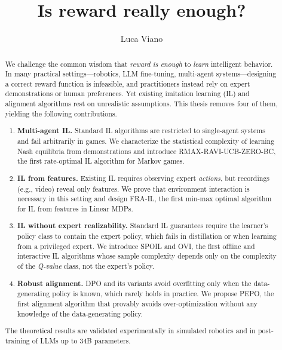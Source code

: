 \documentclass{article}
\title{\textbf{Is reward really enough?}}
\author[1]{Luca Viano}
\affil[1]{EPFL}
\begin{document}
\maketitle
\begin{abstract}
We challenge the common wisdom that \emph{reward is enough} to \emph{learn} intelligent behavior. In many practical settings---robotics, LLM fine-tuning, multi-agent systems---designing a correct reward function is infeasible, and practitioners instead rely on expert demonstrations or human preferences. Yet existing imitation learning (IL) and alignment algorithms rest on unrealistic assumptions. This thesis removes four of them, yielding the following contributions.
\begin{enumerate}
    \item \textbf{Multi-agent IL.} Standard IL algorithms are restricted to single-agent systems and fail arbitrarily in games. We characterize the statistical complexity of learning Nash equilibria from demonstrations and introduce RMAX-RAVI-UCB-ZERO-BC, the first rate-optimal IL algorithm for Markov games.
    \item \textbf{IL from features.} Existing IL requires observing expert \emph{actions}, but recordings (e.g., video) reveal only features. We prove that environment interaction is necessary in this setting and design FRA-IL, the first min-max optimal algorithm for IL from features in Linear MDPs.
    \item \textbf{IL without expert realizability.} Standard IL guarantees require the learner's policy class to contain the expert policy, which fails in distillation or when learning from a privileged expert. We introduce SPOIL and OVI, the first offline and interactive IL algorithms whose sample complexity depends only on the complexity of the \emph{Q-value} class, not the expert's policy.
    \item \textbf{Robust alignment.} DPO and its variants avoid overfitting only when the data-generating policy is known, which rarely holds in practice. We propose PEPO, the first alignment algorithm that provably avoids over-optimization without any knowledge of the data-generating policy.
\end{enumerate}
The theoretical results are validated experimentally in simulated robotics and in post-training of LLMs up to 34B parameters.
\end{abstract}
\end{document}
